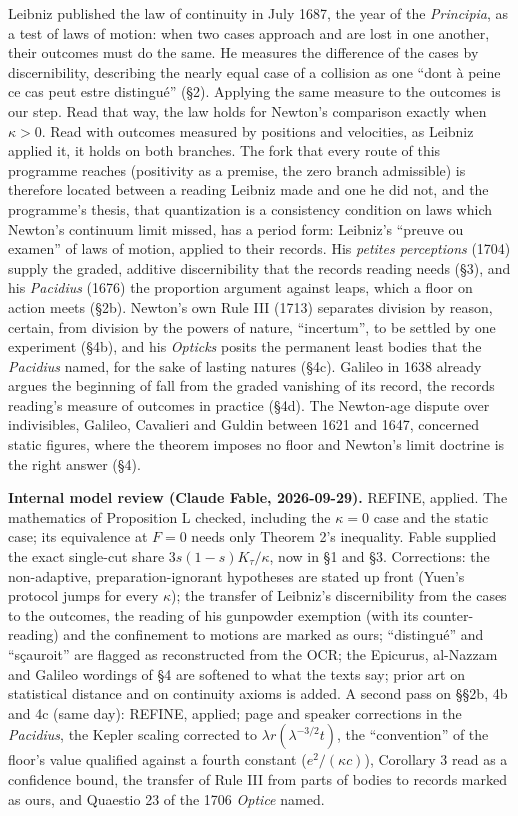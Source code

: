 \documentclass[11pt,a4paper]{article}
\begin{document}
Leibniz published the law of continuity in July 1687, the year of the
\emph{Principia}, as a test of laws of motion: when two cases approach
and are lost in one another, their outcomes must do the same. He
measures the difference of the cases by discernibility, describing the
nearly equal case of a collision as one ``dont à peine ce cas peut estre
distingué'' (§2). Applying the same measure to the outcomes is our step.
Read that way, the law holds for Newton's comparison exactly when
\(\kappa>0\). Read with outcomes measured by positions and velocities,
as Leibniz applied it, it holds on both branches. The fork that every
route of this programme reaches (positivity as a premise, the zero
branch admissible) is therefore located between a reading Leibniz made
and one he did not, and the programme's thesis, that quantization is a
consistency condition on laws which Newton's continuum limit missed, has
a period form: Leibniz's ``preuve ou examen'' of laws of motion, applied
to their records. His \emph{petites perceptions} (1704) supply the
graded, additive discernibility that the records reading needs (§3), and
his \emph{Pacidius} (1676) the proportion argument against leaps, which
a floor on action meets (§2b). Newton's own Rule III (1713) separates
division by reason, certain, from division by the powers of nature,
``incertum'', to be settled by one experiment (§4b), and his
\emph{Opticks} posits the permanent least bodies that the
\emph{Pacidius} named, for the sake of lasting natures (§4c). Galileo in
1638 already argues the beginning of fall from the graded vanishing of
its record, the records reading's measure of outcomes in practice (§4d).
The Newton-age dispute over indivisibles, Galileo, Cavalieri and Guldin
between 1621 and 1647, concerned static figures, where the theorem
imposes no floor and Newton's limit doctrine is the right answer (§4).

\textbf{Internal model review (Claude Fable, 2026-09-29).} REFINE,
applied. The mathematics of Proposition L checked, including the
\(\kappa=0\) case and the static case; its equivalence at \(F=0\) needs
only Theorem 2's inequality. Fable supplied the exact single-cut share
\(3s(1-s)K_\tau/\kappa\), now in §1 and §3. Corrections: the
non-adaptive, preparation-ignorant hypotheses are stated up front
(Yuen's protocol jumps for every \(\kappa\)); the transfer of Leibniz's
discernibility from the cases to the outcomes, the reading of his
gunpowder exemption (with its counter-reading) and the confinement to
motions are marked as ours; ``distingué'' and ``sçauroit'' are flagged
as reconstructed from the OCR; the Epicurus, al-Nazzam and Galileo
wordings of §4 are softened to what the texts say; prior art on
statistical distance and on continuity axioms is added. A second pass on
§§2b, 4b and 4c (same day): REFINE, applied; page and speaker
corrections in the \emph{Pacidius}, the Kepler scaling corrected to
\(\lambda r(\lambda^{-3/2}t)\), the ``convention'' of the floor's value
qualified against a fourth constant (\(e^2/(\kappa c)\)), Corollary 3
read as a confidence bound, the transfer of Rule III from parts of
bodies to records marked as ours, and Quaestio 23 of the 1706
\emph{Optice} named.
\end{document}
